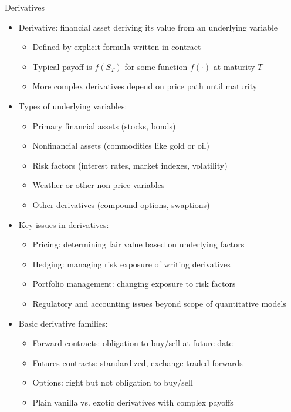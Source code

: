 \documentclass[10pt]{beamer}
\begin{document}
\begin{frame}{Derivatives}
  \begin{itemize}[<+->]
    \item Derivative: financial asset deriving its value from an underlying variable
      \begin{itemize}
        \item Defined by explicit formula written in contract
        \item Typical payoff is $f(S_T)$ for some function $f(\cdot)$ at maturity $T$
        \item More complex derivatives depend on price path until maturity
      \end{itemize}
    \item Types of underlying variables:
      \begin{itemize}
        \item Primary financial assets (stocks, bonds)
        \item Nonfinancial assets (commodities like gold or oil)
        \item Risk factors (interest rates, market indexes, volatility)
        \item Weather or other non-price variables
        \item Other derivatives (compound options, swaptions)
      \end{itemize}
    \item Key issues in derivatives:
      \begin{itemize}
        \item Pricing: determining fair value based on underlying factors
        \item Hedging: managing risk exposure of writing derivatives
        \item Portfolio management: changing exposure to risk factors
        \item Regulatory and accounting issues beyond scope of quantitative models
      \end{itemize}
    \item Basic derivative families:
      \begin{itemize}
        \item Forward contracts: obligation to buy/sell at future date
        \item Futures contracts: standardized, exchange-traded forwards
        \item Options: right but not obligation to buy/sell
        \item Plain vanilla vs. exotic derivatives with complex payoffs
      \end{itemize}
  \end{itemize}
\end{frame}
\end{document}
